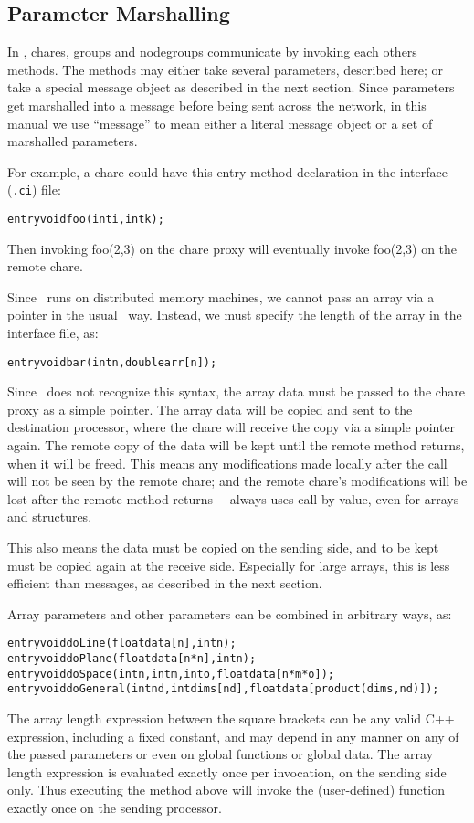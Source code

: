 \subsection{Parameter Marshalling}

\label{marshalling}

\experimental{}	
In \charmpp, chares, groups and 
nodegroups communicate by invoking each others methods. 
The methods may either take several parameters, described here; 
or take a special message object as described in the next section.
Since parameters get marshalled into a message before being
sent across the network, in this manual we use ``message''
to mean either a literal message object or a set of marshalled
parameters.

For example, a chare could have this entry method declaration in 
the interface ({\tt .ci}) file:
\begin{alltt}
  entry void foo(int i,int k);
\end{alltt}
Then invoking foo(2,3) on the chare proxy will eventually
invoke foo(2,3) on the remote chare.

Since \charmpp\ runs on distributed memory machines, we cannot
pass an array via a pointer in the usual \CC\ way.  Instead,
we must specify the length of the array in the interface file, as:
\begin{alltt}
  entry void bar(int n,double arr[n]);
\end{alltt}
Since \CC\ does not recognize this syntax, the array data
must be passed to the chare proxy as a simple pointer.
The array data will be copied and sent to the
destination processor, where the chare will receive the copy
via a simple pointer again.  The remote copy of the data
will be kept until the remote method returns, when
it will be freed.  
This means any modifications made locally after the call will not be 
seen by the remote chare; and the remote chare's modifications
will be lost after the remote method returns-- \charmpp\ always 
uses call-by-value, even for arrays and structures.  

This also means the data must be copied on the sending 
side, and to be kept must be copied again 
at the receive side.  Especially for large arrays, this 
is less efficient than messages, as described in the next section.

Array parameters and other parameters can be combined in arbitrary ways, as:
\begin{alltt}
  entry void doLine(float data[n],int n);
  entry void doPlane(float data[n*n],int n);
  entry void doSpace(int n,int m,int o,float data[n*m*o]);
  entry void doGeneral(int nd,int dims[nd],float data[product(dims,nd)]);
\end{alltt}
The array length expression between the square brackets can be 
any valid C++ expression, including a fixed constant, and may depend 
in any manner on any of the passed
parameters or even on global functions or global data.  The array length 
expression is evaluated exactly once per invocation, on the sending side only.
Thus executing the  method above will invoke the 
(user-defined)  function exactly once on the sending
processor.

